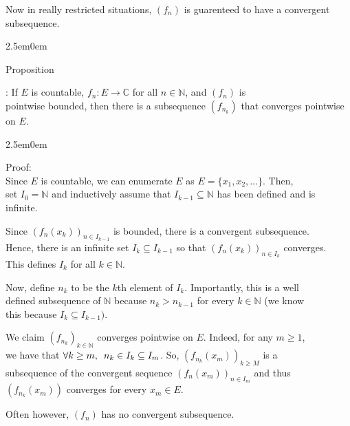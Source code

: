 \documentclass{book}
\newcommand{\hTwo}{%
   \color{MidnightBlue}%
   \fontsize{13}{15}\selectfont%
}
\newcommand{\hThree}{%
   \color{PineGreen!85!Orange}
   \fontsize{13}{15}\selectfont%
}
\newenvironment{myIndent}{%
   \begin{adjustwidth}{2.5em}{0em}%
}{%
   \end{adjustwidth}%
}
\newcommand{\myHS}{ \hspace{0.5em}}
\newcounter{PropNumber}
\newcommand{\propCount}[1][1]{%
   \addtocounter{PropNumber}{#1}%
   \thePropNumber%
}
\newcommand{\retTwo}{\hfill\bigbreak}
\begin{document}
Now in really restricted situations, $(f_n)$ is guarenteed to have a convergent\\ subsequence.\\ [-6pt]
{\begin{myIndent}\hTwo
   Proposition \propCount: If $E$ is countable, $f_n: E \longrightarrow \mathbb{C}$ for all $n \in \mathbb{N}$, and $(f_n)$ is\\ pointwise bounded, then there is a subsequence $(f_{n_k})$ that converges pointwise\\ on $E$.\\ [-9pt]
   
   {\begin{myIndent}\hThree
      Proof:\\
      Since $E$ is countable, we can enumerate $E$ as $E = \{x_1, x_2, \ldots\}$. Then,\\ set $I_0 = \mathbb{N}$  and inductively assume that $I_{k-1} \subseteq \mathbb{N}$ has been defined and is\\ infinite.

      \newpage

      Since $(f_n(x_k))_{n \in I_{k-1}}$ is bounded, there is a convergent subsequence.\\ Hence, there is an infinite set $I_k \subseteq I_{k-1}$ so that $(f_n(x_k))_{n\in I_k}$ converges.\\ This defines $I_k$ for all $k \in \mathbb{N}$.\retTwo

      Now, define $n_k$ to be the $k$th element of $I_k$. Importantly, this is a well\\ defined subsequence of $\mathbb{N}$ because $n_k > n_{k-1}$ for every $k \in \mathbb{N}$ (we know\\ this because $I_k \subseteq I_{k-1})$.\retTwo

      We claim $(f_{n_k})_{k\in\mathbb{N}}$ converges pointwise on $E$. Indeed, for any $m \geq 1$,\\ we have that $\forall k \geq m,\myHS n_k \in I_k \subseteq I_m$. So, $(f_{n_k}(x_m))_{k\geq M}$ is a\\ subsequence of the convergent sequence $(f_n(x_m))_{n\in I_m}$ and thus\\ $(f_{n_k}(x_m))$ converges for every $x_m \in E$.\retTwo
   \end{myIndent}}
\end{myIndent}}

Often however, $(f_n)$ has no convergent subsequence.
\end{document}
